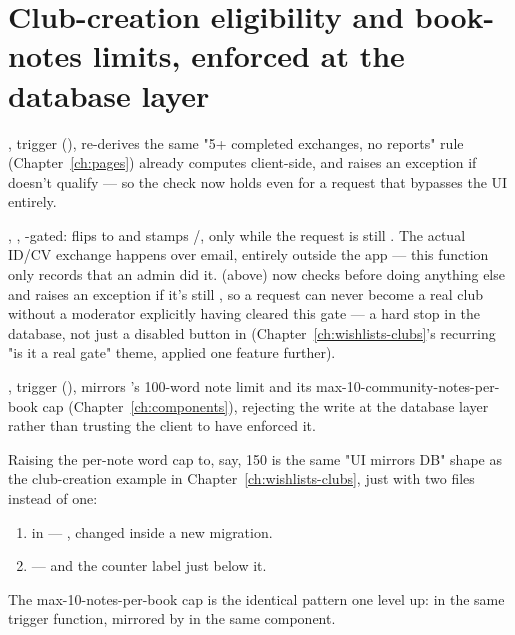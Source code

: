 \section{Club-creation eligibility and book-notes limits, enforced at the database layer}

, trigger  (), re-derives the same "5+ completed exchanges, no reports" rule  (Chapter~\ref{ch:pages}) already computes client-side, and raises an exception if  doesn't qualify — so the check now holds even for a request that bypasses the UI entirely.

, , -gated: flips  to  and stamps /, only while the request is still . The actual ID/CV exchange happens over email, entirely outside the app — this function only records that an admin did it.  (above) now checks  before doing anything else and raises an exception if it's still , so a request can never become a real club without a moderator explicitly having cleared this gate — a hard stop in the database, not just a disabled button in  (Chapter~\ref{ch:wishlists-clubs}'s recurring "is it a real gate" theme, applied one feature further).

, trigger  (), mirrors 's 100-word note limit and its max-10-community-notes-per-book cap (Chapter~\ref{ch:components}), rejecting the write at the database layer rather than trusting the client to have enforced it.

\begin{olkhowto}
Raising the per-note word cap to, say, 150 is the same "UI mirrors DB" shape as the club-creation example in Chapter~\ref{ch:wishlists-clubs}, just with two files instead of one:
\begin{enumerate}
  \item {} in  — , changed inside a new migration.
  \item {} —  and the  counter label just below it.
\end{enumerate}
The max-10-notes-per-book cap is the identical pattern one level up:  in the same trigger function, mirrored by  in the same component.
\end{olkhowto}

